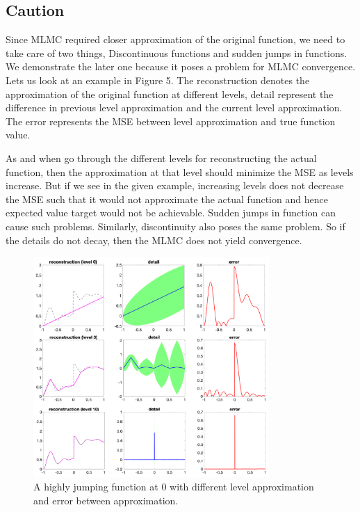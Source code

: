 \documentclass[12pt]{article}
\begin{document}
\subsection{Caution}
Since MLMC required closer approximation of the original function, we need to take care of two things, Discontinuous functions and sudden jumps in functions. We demonstrate the later one because it poses a problem for MLMC convergence. Lets us look at an example in Figure 5. The reconstruction denotes the approximation of the original function at different levels, detail represent the difference in previous level approximation and the current level approximation. The error represents the MSE between level approximation and true function value. 
\par As and when go through the different levels for reconstructing the actual function, then the approximation at that level should minimize the MSE as levels increase. But if we see in the given example, increasing levels does not decrease the MSE such that it would not approximate the actual function and hence expected value target would not be achievable. Sudden jumps in function can cause such problems. Similarly, discontinuity also poses the same problem. So if the details do not decay, then the MLMC does not yield convergence.

\clearpage 

\begin{figure}[h!]
\centering
\includegraphics[width=0.8\textwidth]{CautionEx.png}
\caption{A highly jumping function at 0 with different level approximation and error between approximation.}
\end{figure}
\end{document}
